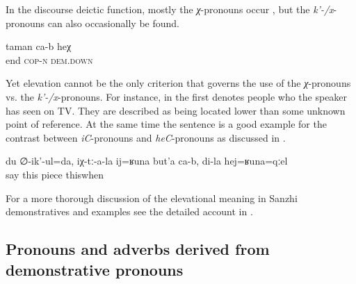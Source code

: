 In the discourse deictic function, mostly the \textit{χ}-pronouns occur , but the \textit{k'-/x}-pronouns can also occasionally be found.

\begin{exe}
	\ex	\label{This is the end (of the story).}
	\gll	taman	ca-b	heχ \\
		end	\textsc{cop-n}	\textsc{dem.down}\\
	\glt	{}
\end{exe}


Yet elevation cannot be the only criterion that governs the use of the \textit{χ}-pronouns vs. the \textit{k'-/x}-pronouns. For instance, in  the first  denotes people who the speaker has seen on TV. They are described as being located lower than some unknown point of reference. At the same time the sentence is a good example for the contrast between \textit{iC}-pronouns and \textit{heC}-pronouns as discussed in . 

\begin{exe}
	\ex	\label{I (masc.) say, they have a (little) piece (of a diamond) like this, while I have one like this}
	\gll	du	∅-ik'-ul=da,	iχ-tː-a-la	ij=ʁuna	but'a	ca-b,	di-la	hej=ʁuna=qːel \\
			say		this	piece			thiswhen\\
	\glt	{}
\end{exe}

For a more thorough discussion of the elevational meaning in Sanzhi demonstratives and examples see the detailed account in \citet{ForkerLTSanzhi}.

\subsection{Pronouns and adverbs derived from demonstrative pronouns}
\label{ssec:Pronouns and adverbs derived from demonstrative pronouns}


